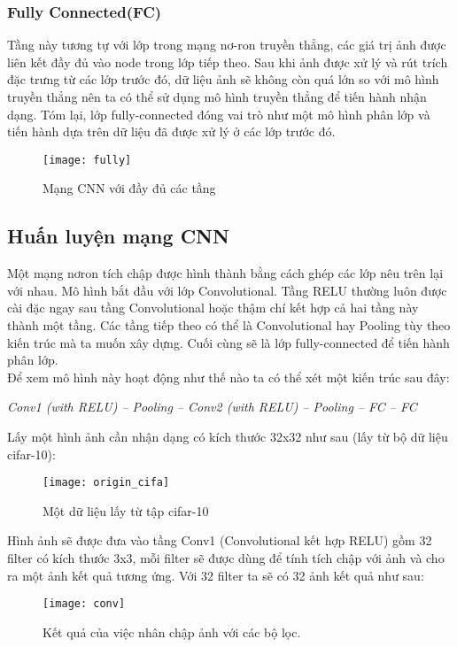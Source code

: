 \documentclass[13pt, a4paper]{extreport}
\begin{document}
\subsubsection{Fully Connected(FC)}
\indent Tầng này tương tự với lớp trong mạng nơ-ron truyền thẳng, các giá trị ảnh được liên kết đầy đủ vào node trong lớp tiếp theo. Sau khi ảnh được xử lý và rút trích đặc trưng từ các lớp trước đó, dữ liệu ảnh sẽ không còn quá lớn so với mô hình truyền thẳng nên ta có thể sử dụng mô hình truyền thẳng để tiến hành nhận dạng. Tóm lại, lớp fully-connected đóng vai trò như một mô hình phân lớp và tiến hành dựa trên dữ liệu đã được xử lý ở các lớp trước đó.
\begin{figure}[H]
  \centering
    \texttt{[image: fully]}
   \caption{\large Mạng CNN với đầy đủ các tầng}
\end{figure}
\subsection{Huấn luyện mạng CNN}
\indent Một mạng nơron tích chập được hình thành bằng cách ghép các lớp nêu trên lại với nhau. Mô hình bắt đầu với lớp Convolutional. Tầng RELU thường luôn được cài đặc ngay sau tầng Convolutional hoặc thậm chí kết hợp cả hai tầng này thành một tầng. Các tầng tiếp theo có thể là Convolutional hay Pooling tùy theo kiến trúc mà ta muốn xây dựng. Cuối cùng sẽ là lớp fully-connected để tiến hành phân lớp.\\
\indent Để xem mô hình này hoạt động như thế nào ta có thể xét một kiến trúc sau đây:
\begin{center}
\textit{Conv1 (with RELU) – Pooling – Conv2 (with RELU) – Pooling – FC – FC}
\end{center}
\indent Lấy một hình ảnh cần nhận dạng có kích thước 32x32 như sau (lấy từ bộ dữ liệu cifar-10):
\begin{figure}[H]
  \centering
    \texttt{[image: origin\_cifa]}
   \caption{\large Một dữ liệu lấy từ tập cifar-10}
\end{figure}
\indent Hình ảnh sẽ được đưa vào tầng Conv1 (Convolutional kết hợp RELU) gồm 32 filter có kích thước 3x3, mỗi filter sẽ được dùng để tính tích chập với ảnh và cho ra một ảnh kết quả tương ứng. Với 32 filter ta sẽ có 32 ảnh kết quả như sau:
\begin{figure}[H]
  \centering
    \texttt{[image: conv]}
   \caption{\large Kết quả của việc nhân chập ảnh với các bộ lọc.}
\end{figure}
\end{document}
